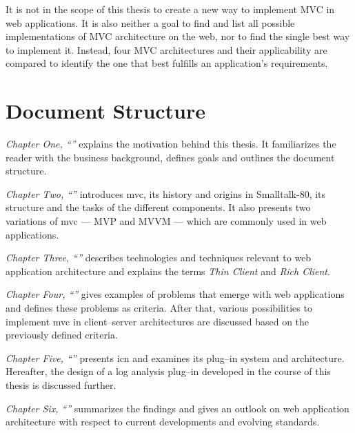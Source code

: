 It is not in the scope of this thesis to create a new way to implement MVC in web applications. It is also neither a goal to find and list all possible implementations of MVC architecture on the web, nor to find the single best way to implement it. Instead, four MVC architectures and their applicability are compared to identify the one that best fulfills an application's requirements.
\newpage
\section{Document Structure}
\emph{Chapter One, ``''} explains the motivation behind this thesis. It familiarizes the reader with the business background, defines goals and outlines the document structure.

\emph{Chapter Two, ``''} introduces \acs{mvc}, its history and origins in \mbox{Smalltalk-80}, its structure and the tasks of the different components. It also presents two variations of \ac{mvc} --- MVP and MVVM --- which are commonly used in web applications.

\emph{Chapter Three, ``''} describes technologies and techniques relevant to web application architecture and explains the terms \emph{Thin Client} and \emph{Rich Client}.

\emph{Chapter Four, ``''} gives examples of problems that emerge with web applications and defines these problems as criteria. After that, various possibilities to implement \ac{mvc} in client--server architectures are discussed based on the previously defined criteria.

\emph{Chapter Five, ``''} presents \acl{icn} and examines its plug--in system and architecture. Hereafter, the design of a log analysis plug--in developed in the course of this thesis is discussed further.

\emph{Chapter Six, ``''} summarizes the findings and gives an outlook on web application architecture with respect to current developments and evolving standards.